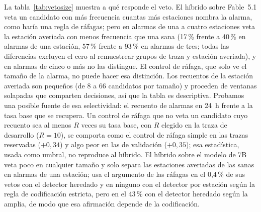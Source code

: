 \documentclass[preprint,11pt]{elsarticle}
\begin{document}
La tabla~\ref{tab:vetosize} muestra a qué responde el veto. El híbrido sobre Fable~5.1 veta un candidato con más frecuencia cuantas más estaciones nombra la alarma, como haría una regla de ráfagas; pero en alarmas de una a cuatro estaciones veta la estación averiada con menos frecuencia que una sana (17\,\% frente a 40\,\% en alarmas de una estación, 57\,\% frente a 93\,\% en alarmas de tres; todas las diferencias excluyen el cero al remuestrear grupos de traza y estación averiada), y en alarmas de cinco o más no las distingue. El control de ráfaga, que solo ve el tamaño de la alarma, no puede hacer esa distinción. Los recuentos de la estación averiada son pequeños (de 8 a 66 candidatos por tamaño) y proceden de ventanas solapadas que comparten decisiones, así que la tabla es descriptiva. Probamos una posible fuente de esa selectividad: el recuento de alarmas en 24~h frente a la tasa base que se recupera. Un control de ráfaga que no veta un candidato cuyo recuento sea al menos $R$ veces su tasa base, con $R$ elegido en la traza de desarrollo ($R=10$), se comporta como el control de ráfaga simple en las trazas reservadas ($+0{,}34$) y algo peor en las de validación ($+0{,}35$); esa estadística, usada como umbral, no reproduce al híbrido. El híbrido sobre el modelo de 7B veta poco en cualquier tamaño y solo separa las estaciones averiadas de las sanas en alarmas de una estación; usa el argumento de las ráfagas en el 0{,}4\,\% de sus vetos con el detector heredado y en ninguno con el detector por estación según la regla de codificación estricta, pero en el 43\,\% con el detector heredado según la amplia, de modo que esa afirmación depende de la codificación.
\end{document}
